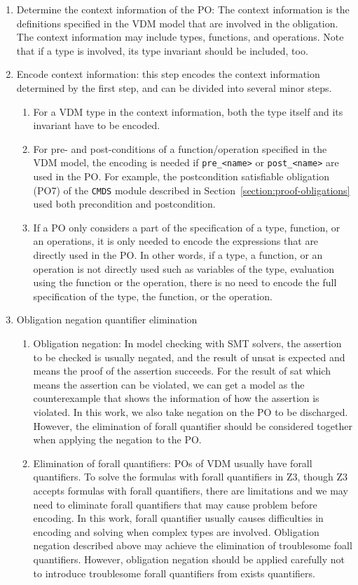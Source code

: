\begin{enumerate}
\item
Determine the context information of the PO: The context information is the definitions specified in the VDM model that are involved in the obligation. The context information may include types, functions, and operations. Note that if a type is involved, its type invariant should be included, too.
\item
Encode context information: this step encodes the context information determined by the first step, and can be divided into several minor steps.
\begin{enumerate}
\item
For a VDM type in the context information, both the type itself and its invariant have to be encoded.
\item
For pre- and post-conditions of a function/operation specified in the VDM model, the encoding is needed if {\tt pre\_<name>} or {\tt post\_<name>} are used in the PO. For example, the postcondition satisfiable obligation (PO7) of the {\tt CMDS} module described in Section~\ref{section:proof-obligations} used both precondition and postcondition.
\item
If a PO only considers a part of the specification of a type, function, or an operations, it is only needed to encode the expressions that are directly used in the PO. In other words, if a type, a function, or an operation is not directly used such as variables of the type, evaluation using the function or the operation, there is no need to encode the full specification of the type, the function, or the operation.
\end{enumerate}
\item
Obligation negation quantifier elimination
\begin{enumerate}
\item
Obligation negation: In model checking with SMT solvers, the assertion to be checked is usually negated, and the result of unsat is expected and means the proof of the assertion succeeds. For the result of sat which means the assertion can be violated, we can get a model as the counterexample that shows the information of how the assertion is violated. In this work, we also take negation on the PO to be discharged. However, the elimination of forall quantifier should be considered together when applying the negation to the PO.
\item
Elimination of forall quantifiers: POs of VDM usually have forall quantifiers. To solve the formulas with forall quantifiers in Z3, though Z3 accepts formulas with forall quantifiers, there are limitations and we may need to eliminate forall quantifiers that may cause problem before encoding. In this work, forall quantifier usually causes difficulties in encoding and solving when complex types are involved. Obligation negation described above may achieve the elimination of troublesome foall quantifiers. However, obligation negation should be applied carefully not to introduce troublesome forall quantifiers from exists quantifiers.
\end{enumerate}
\end{enumerate}

